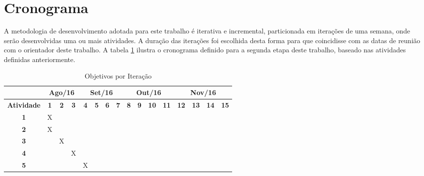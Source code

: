 \section{\label{section:work-plan-schedule}Cronograma}
A metodologia de desenvolvimento adotada para este trabalho é iterativa e
incremental, particionada em iterações de uma semana, onde serão desenvolvidas
uma ou mais atividades. A duração das iterações foi escolhida desta forma para
que coincidisse com as datas de reunião com o orientador deste trabalho. A
tabela \ref{tab:work-plan} ilustra o cronograma definido para a segunda etapa
deste trabalho, baseado nas atividades definidas anteriormente.

\begin{table}[H]
\centering
\caption{Objetivos por Iteração}
\label{tab:work-plan}
\begin{tabular}{c|c|c|c|c|c|c|c|c|c|c|c|c|c|c|c|}
\cline{2-16}
{\bf}                                 & \multicolumn{3}{c|}{{\bf Ago/16}} & \multicolumn{4}{c|}{{\bf Set/16}}     & \multicolumn{4}{c|}{{\bf Out/16}}      & \multicolumn{4}{c|}{{\bf Nov/16}}     \\ \hline
\multicolumn{1}{|c|}{{\bf Atividade}} & {\bf 1} & {\bf 2} & {\bf 3}	      & {\bf 4} & {\bf 5} & {\bf 6} & {\bf 7} & {\bf 8} & {\bf 9} & {\bf 10} & \bf{11} & \bf{12} & \bf{13} & \bf{14} & \bf{15} \\ \hline
\multicolumn{1}{|c|}{{\bf 1}}         & X       &         &               &         &         &         &         &         &         &          &         &         &         &         &         \\ \hline
\multicolumn{1}{|c|}{{\bf 2}}         & X       &         &               &         &         &         &         &         &         &          &         &         &         &         &         \\ \hline
\multicolumn{1}{|c|}{{\bf 3}}         &         & X       &               &         &         &         &         &         &         &          &         &         &         &         &         \\ \hline
\multicolumn{1}{|c|}{{\bf 4}}         &         &         & X             &         &         &         &         &         &         &          &         &         &         &         &         \\ \hline
\multicolumn{1}{|c|}{{\bf 5}}         &         &         &               & X       &         &         &         &         &         &          &         &         &         &         &         \\ \hline

\end{tabular}
\end{table}
